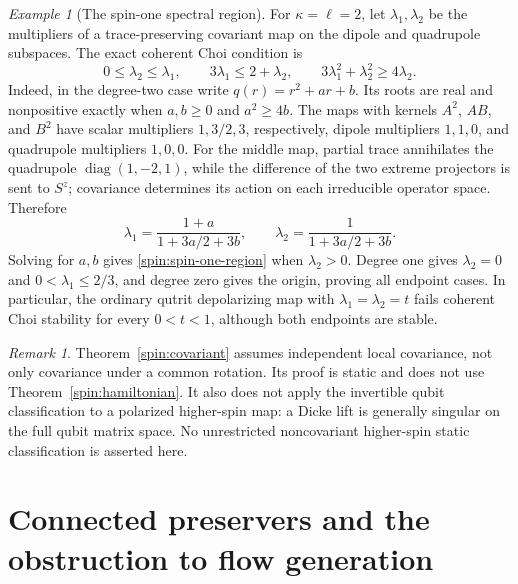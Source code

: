 \documentclass[reqno]{amsart}
\theoremstyle{definition}
\theoremstyle{remark}
\newtheorem{remark}[theorem]{Remark}
\newtheorem{example}[theorem]{Example}
\DeclareMathOperator{\diag}{diag}
\begin{document}
\begin{example}[The spin-one spectral region]\label{spin:spin-one}
For $\kappa=\ell=2$, let $\lambda_1,\lambda_2$ be the multipliers of a
trace-preserving covariant map on the dipole and quadrupole subspaces.
The exact coherent Choi condition is
\begin{equation}\label{spin:spin-one-region}
 0\leq\lambda_2\leq\lambda_1,\qquad
 3\lambda_1\leq2+\lambda_2,\qquad
 3\lambda_1^2+\lambda_2^2\geq4\lambda_2.
\end{equation}
Indeed, in the degree-two case write $q(r)=r^2+ar+b$.
Its roots are real and nonpositive exactly when
$a,b\geq0$ and $a^2\geq4b$.  The maps with kernels $A^2$, $AB$,
and $B^2$ have scalar multipliers $1,3/2,3$, respectively, dipole
multipliers $1,1,0$, and quadrupole multipliers $1,0,0$.
For the middle map, partial trace annihilates the quadrupole
$\diag(1,-2,1)$, while the difference of the two extreme projectors is
sent to $S^z$; covariance determines its action on each irreducible
operator space.  Therefore
\[
 \lambda_1=\frac{1+a}{1+3a/2+3b},\qquad
 \lambda_2=\frac1{1+3a/2+3b}.
\]
Solving for $a,b$ gives \eqref{spin:spin-one-region} when
$\lambda_2>0$.  Degree one gives
$\lambda_2=0$ and $0<\lambda_1\leq2/3$, and degree zero gives the
origin, proving all endpoint cases.  In particular, the ordinary
qutrit depolarizing map with $\lambda_1=\lambda_2=t$ fails coherent
Choi stability for every $0<t<1$, although both endpoints are stable.
\end{example}

\begin{remark}\label{spin:scope}
Theorem~\ref{spin:covariant} assumes independent local covariance, not
only covariance under a common rotation.  Its proof is static and does
not use Theorem~\ref{spin:hamiltonian}.  It also does not apply the
invertible qubit classification to a polarized higher-spin map: a
Dicke lift is generally singular on the full qubit matrix space.
No unrestricted noncovariant higher-spin static classification is
asserted here.
\end{remark}


\section{Connected preservers and the obstruction to flow generation}
\label{glob:section}
\end{document}
